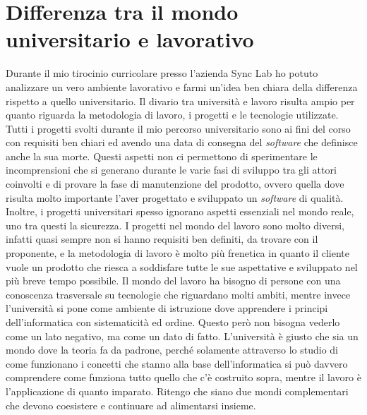 
\section{Differenza tra il mondo universitario e lavorativo}
Durante il mio tirocinio curricolare presso l'azienda Sync Lab ho potuto analizzare un vero ambiente lavorativo e farmi un'idea ben chiara della differenza rispetto a quello universitario. Il divario tra università e lavoro risulta ampio per quanto riguarda la metodologia di lavoro, i progetti e le tecnologie utilizzate. Tutti i progetti svolti durante il mio percorso universitario sono ai fini del corso con requisiti ben chiari ed avendo una data di consegna del \textit{software} che definisce anche la sua morte. Questi aspetti non ci permettono di sperimentare le incomprensioni che si generano durante le varie fasi di sviluppo tra gli attori coinvolti e di provare la fase di manutenzione del prodotto, ovvero quella dove risulta molto importante l'aver progettato e sviluppato un \textit{software} di qualità. Inoltre, i progetti universitari spesso ignorano aspetti essenziali nel mondo reale, uno tra questi la sicurezza.
I progetti nel mondo del lavoro sono molto diversi, infatti quasi sempre non si hanno requisiti ben definiti, da trovare con il proponente, e la metodologia di lavoro è molto più frenetica in quanto il cliente vuole un prodotto che riesca a soddisfare tutte le sue aspettative e sviluppato nel più breve tempo possibile. 
Il mondo del lavoro ha bisogno di persone con una conoscenza trasversale su tecnologie che riguardano molti ambiti, mentre invece l'università si pone come ambiente di istruzione dove apprendere i principi dell'informatica con sistematicità ed ordine. 
Questo però non bisogna vederlo come un lato negativo, ma come un dato di fatto. L'università è giusto che sia un mondo dove la teoria fa da padrone, perché solamente attraverso lo studio di come funzionano i concetti che stanno alla base dell'informatica si può davvero comprendere come funziona tutto quello che c'è costruito sopra, mentre il lavoro è l'applicazione di quanto imparato. Ritengo che siano due mondi complementari che devono coesistere e continuare ad alimentarsi insieme. \\

